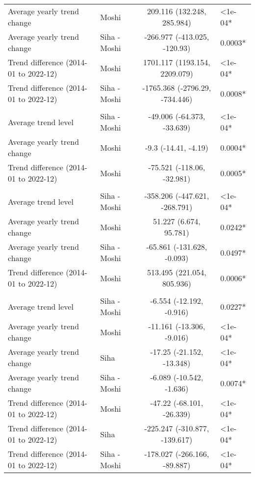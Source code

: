 \begin{longtable}{l|lcl}
Average yearly trend change & Moshi & 209.116 (132.248, 285.984) & <1e-04* \\ 
Average yearly trend change & Siha - Moshi & -266.977 (-413.025, -120.93) & 0.0003* \\ 
Trend difference (2014-01 to 2022-12) & Moshi & 1701.117 (1193.154, 2209.079) & <1e-04* \\ 
Trend difference (2014-01 to 2022-12) & Siha - Moshi & -1765.368 (-2796.29, -734.446) & 0.0008* \\ 
\midrule\addlinespace[2.5pt]
\multicolumn{4}{l}{Trauma} \\ 
\midrule\addlinespace[2.5pt]
Average trend level & Siha - Moshi & -49.006 (-64.373, -33.639) & <1e-04* \\ 
Average yearly trend change & Moshi & -9.3 (-14.41, -4.19) & 0.0004* \\ 
Trend difference (2014-01 to 2022-12) & Moshi & -75.521 (-118.06, -32.981) & 0.0005* \\ 
\midrule\addlinespace[2.5pt]
\multicolumn{4}{l}{Urinary Infections} \\ 
\midrule\addlinespace[2.5pt]
Average trend level & Siha - Moshi & -358.206 (-447.621, -268.791) & <1e-04* \\ 
Average yearly trend change & Moshi & 51.227 (6.674, 95.781) & 0.0242* \\ 
Average yearly trend change & Siha - Moshi & -65.861 (-131.628, -0.093) & 0.0497* \\ 
Trend difference (2014-01 to 2022-12) & Moshi & 513.495 (221.054, 805.936) & 0.0006* \\ 
\midrule\addlinespace[2.5pt]
\multicolumn{4}{l}{Vector-borne Infections} \\ 
\midrule\addlinespace[2.5pt]
Average trend level & Siha - Moshi & -6.554 (-12.192, -0.916) & 0.0227* \\ 
Average yearly trend change & Moshi & -11.161 (-13.306, -9.016) & <1e-04* \\ 
Average yearly trend change & Siha & -17.25 (-21.152, -13.348) & <1e-04* \\ 
Average yearly trend change & Siha - Moshi & -6.089 (-10.542, -1.636) & 0.0074* \\ 
Trend difference (2014-01 to 2022-12) & Moshi & -47.22 (-68.101, -26.339) & <1e-04* \\ 
Trend difference (2014-01 to 2022-12) & Siha & -225.247 (-310.877, -139.617) & <1e-04* \\ 
Trend difference (2014-01 to 2022-12) & Siha - Moshi & -178.027 (-266.166, -89.887) & <1e-04* \\ 

\end{longtable}
